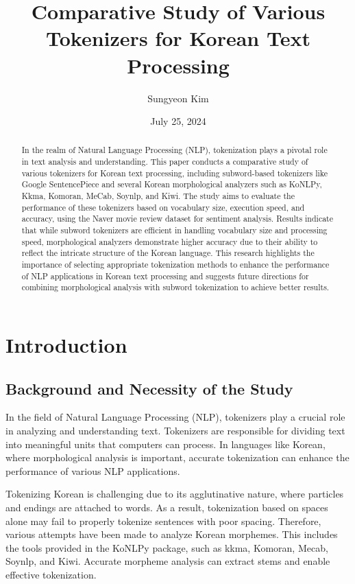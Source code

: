 \documentclass{article}
\title{Comparative Study of Various Tokenizers for Korean Text Processing}
\author{Sungyeon Kim}
\date{July 25, 2024}
\begin{document}
\maketitle
\begin{abstract}
In the realm of Natural Language Processing (NLP), tokenization plays a pivotal role in text analysis and understanding. This paper conducts a comparative study of various tokenizers for Korean text processing, including subword-based tokenizers like Google SentencePiece and several Korean morphological analyzers such as KoNLPy, Kkma, Komoran, MeCab, Soynlp, and Kiwi. The study aims to evaluate the performance of these tokenizers based on vocabulary size, execution speed, and accuracy, using the Naver movie review dataset for sentiment analysis. Results indicate that while subword tokenizers are efficient in handling vocabulary size and processing speed, morphological analyzers demonstrate higher accuracy due to their ability to reflect the intricate structure of the Korean language. This research highlights the importance of selecting appropriate tokenization methods to enhance the performance of NLP applications in Korean text processing and suggests future directions for combining morphological analysis with subword tokenization to achieve better results.
\end{abstract}


\section{Introduction}

\subsection{Background and Necessity of the Study}

In the field of Natural Language Processing (NLP), tokenizers play a crucial role in analyzing and understanding text. Tokenizers are responsible for dividing text into meaningful units that computers can process. In languages like Korean, where morphological analysis is important, accurate tokenization can enhance the performance of various NLP applications.

Tokenizing Korean is challenging due to its agglutinative nature, where particles and endings are attached to words. As a result, tokenization based on spaces alone may fail to properly tokenize sentences with poor spacing. Therefore, various attempts have been made to analyze Korean morphemes. This includes the tools provided in the KoNLPy package, such as kkma, Komoran, Mecab, Soynlp, and Kiwi. Accurate morpheme analysis can extract stems and enable effective tokenization.
\end{document}

